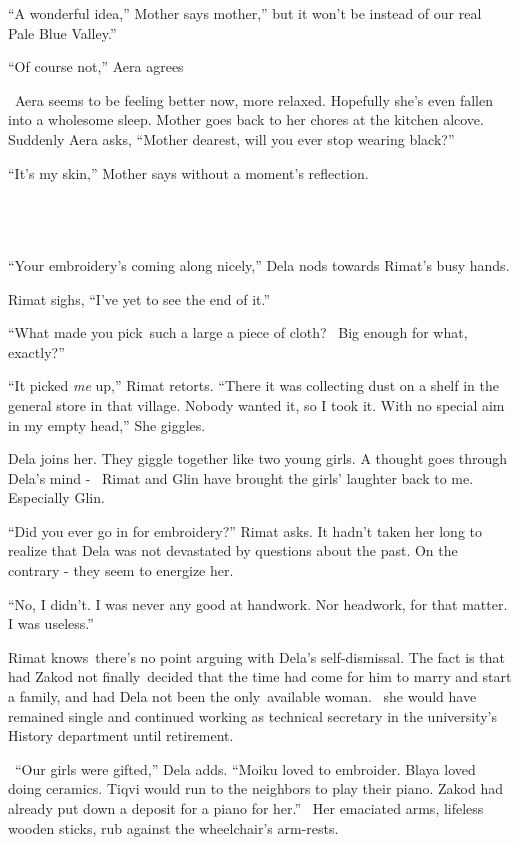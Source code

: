 \documentclass[twoside,11pt]{book}
\begin{document}
``A wonderful idea,'' Mother says mother,'' but it won't be instead of our real
Pale Blue Valley.''

``Of course not,'' Aera agrees

\ Aera seems to be feeling better now, more relaxed. Hopefully she's even fallen into a wholesome sleep. Mother goes
back to her chores at the kitchen alcove. Suddenly Aera asks, ``Mother dearest, will you ever stop wearing
black?''

``It's my{ }skin,'' Mother says without a moment's reflection.

~

\chapter{}

``Your embroidery's coming along nicely,'' Dela nods towards Rimat's busy hands.

Rimat sighs, ``I've yet to see the end of it.''

``What made you pick~such a large a piece of cloth? \ Big enough for what, exactly?''

``It picked \textit{me} up,'' Rimat retorts. ``There it was collecting dust on a
shelf in the general store in that village. Nobody wanted it, so I took it. With no special aim in my empty
head,'' She giggles.

Dela joins her. They giggle together like two young girls. A thought goes through Dela's mind - \ Rimat and Glin have
brought the girls' laughter back to me. Especially Glin.

``Did you ever go in for embroidery?'' Rimat asks. It hadn't taken her long to realize that
Dela was not devastated by questions about the past. On the contrary - they seem to energize her.

``No, I didn't. I was never any good at handwork. Nor headwork, for that matter. I was
useless.''

Rimat knows~there's no point arguing with Dela's self-dismissal. The fact is that had Zakod not finally~decided that the
time had come for him to marry and start a family, and had Dela not been the only~available woman. \ she would have
remained single and continued working as technical secretary in the university's History department until retirement.

~``Our girls were gifted,'' Dela adds. ``Moiku loved to embroider. Blaya loved
doing ceramics. Tiqvi would run to the neighbors to play their piano. Zakod had already put down a deposit for a piano
for her.'' \ Her emaciated arms, lifeless wooden sticks, rub against the wheelchair's arm-rests.
\end{document}

